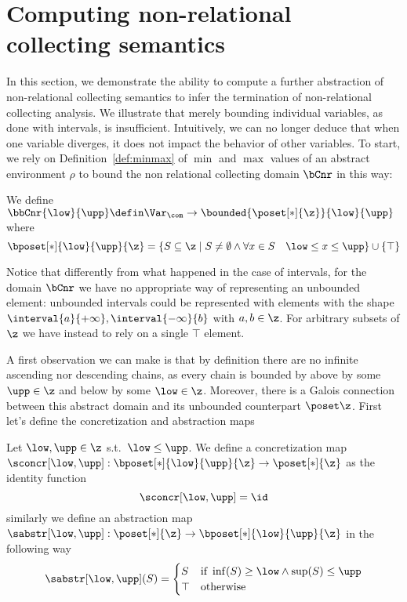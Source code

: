 \section{Computing non-relational collecting semantics}\label{sec:computingnonrel}

In this section, we demonstrate the ability to compute a further
abstraction of non-relational collecting semantics to infer the
termination of non-relational collecting analysis. We illustrate that
merely bounding individual variables, as done with intervals, is
insufficient. Intuitively, we can no longer deduce that when one
variable diverges, it does not impact the behavior of other variables.
To start, we rely on Definition~\ref{def:minmax} of \(\min\) and
\(\max\) values of an abstract environment \(\rho\) to bound the non
relational collecting domain \(\bCnr\) in this way:

\begin{definition}
  We define
  \(\bbCnr{\low}{\upp} \defin \Var_{\com} \to \bounded{\poset[*]{\z}}{\low}{\upp}\) where
  \begin{equation*}
    \bposet[*]{\low}{\upp}{\z} = \{S \subseteq \z \mid S \neq \emptyset \land \forall x \in S \quad \low \leq x \leq \upp\} \cup \{\top\}
  \end{equation*}
\end{definition}
Notice that differently from what happened in the case of intervals,
for the domain \(\bCnr\) we have no appropriate way of representing an
unbounded element: unbounded intervals could be represented with
elements with the shape
\(\interval{a}{+\infty}, \interval{-\infty}{b}\) with \(a,b\in
\z\). For arbitrary subsets of \(\z\) we have instead to rely on a
single \(\top\) element.

\medskip

\noindent
A first observation we can make is that by definition there are no
infinite ascending nor descending chains, as every chain is bounded by
above by some \(\upp \in \z\) and below by some \(\low\in\z\). Moreover,
there is a Galois connection between this abstract domain and its
unbounded counterpart \(\poset\z\). First let's define the
concretization and abstraction maps

\begin{definition}\label{def:abstrnrb}
  Let \(\low,\upp\in\z\) s.t.\ \(\low \leq \upp\). We define a
  concretization map
  \(\sconcr[\low,\upp] : \bposet[*]{\low}{\upp}{\z} \to \poset[*]{\z}\) as
  the identity function
  \begin{equation*}
    \sconcr[\low,\upp] = \id
  \end{equation*}
  similarly we define an abstraction map
  \(\sabstr[\low,\upp] : \poset[*]{\z} \to \bposet[*]{\low}{\upp}{\z}\) in
  the following way
  \begin{equation*}
    \sabstr[\low,\upp](S) = \begin{cases}
      S & \text{if } \inf(S) \geq \low \land \sup(S) \leq \upp \\
      \top & \text{otherwise}
    \end{cases}
  \end{equation*}
\end{definition}

